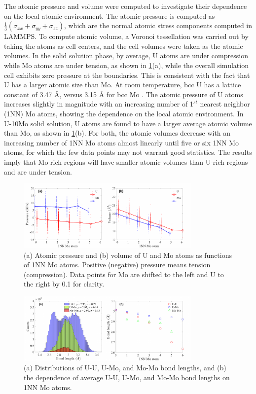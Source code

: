 \documentclass[review]{elsarticle}
\begin{document}
The atomic pressure and volume were computed to investigate their dependence on the local atomic environment. The atomic pressure is computed as $\frac{1}{3}(\sigma_{xx}+\sigma_{yy}+\sigma_{zz})$, which are the normal atomic stress components computed in LAMMPS. To compute atomic volume, a Voronoi tessellation was carried out by taking the atoms as cell centers, and the cell volumes were taken as the atomic volumes. In the solid solution phase, by average, U atoms are under compression while Mo atoms are under tension, as shown in \cref{fig:vol_pressure}(a), while the overall simulation cell exhibits zero pressure at the boundaries. This is consistent with the fact that U has a larger atomic size than Mo. At room temperature, bcc U has a lattice constant of 3.47 {\AA}, versus 3.15 {\AA} for bcc Mo \cite{steiner_2016}. The atomic pressure of U atoms increases slightly in magnitude with an increasing number of 1$^{st}$ nearest neighbor (1NN) Mo atoms, showing the dependence on the local atomic environment. In U-10Mo solid solution, U atoms are found to have a larger average atomic volume than Mo, as shown in \cref{fig:vol_pressure}(b). For both, the atomic volumes decrease with an increasing number of 1NN Mo atoms almost linearly until five or six 1NN Mo atoms, for which the few data points may not warrant good statistics. The results imply that Mo-rich regions will have smaller atomic volumes than U-rich regions and are under tension. 

\begin{figure}[h!]
 \centering
 \includegraphics[width=0.8\textwidth]{vol_pressure} 
 \caption{(a) Atomic pressure and (b) volume of U and Mo atoms as functions of 1NN Mo atoms. Positive (negative) pressure means tension (compression). Data points for Mo are shifted to the left and U to the right by 0.1 for clarity. }
 \label{fig:vol_pressure}
\end{figure}

\begin{figure}[h!]
 \centering
 \includegraphics[width=0.8\textwidth]{bond_length} 
 \caption{(a) Distributions of U-U, U-Mo, and Mo-Mo bond lengths, and (b) the dependence of average U-U, U-Mo, and Mo-Mo bond lengths on 1NN Mo atoms.}
 \label{fig:bond_length}
\end{figure}
\end{document}

